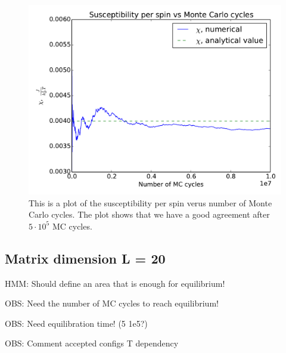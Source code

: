 \begin{figure}[H]
\includegraphics[width=\linewidth]{../results/4b/L_2_susceptibility}\caption{This is a plot of the susceptibility per spin verus number of Monte Carlo cycles. The plot shows that we have a good agreement after $ 5 \cdot 10^{5} $ MC cycles.}\label{fig:L_2_susceptibility}
\end{figure}

\subsection{Matrix dimension L = 20}

HMM: Should define an area that is enough for equilibrium!

OBS: Need the number of MC cycles to reach equilibrium!

OBS: Need equilibration time! (5 1e5?)

OBS: Comment accepted configs T dependency

